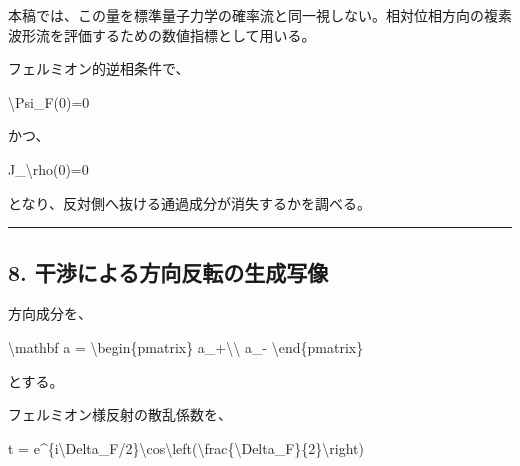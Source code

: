 \documentclass[
  a4paper,
]{article}
\newenvironment{Shaded}{}{}
\newcommand{\NormalTok}[1]{#1}
\begin{document}
本稿では、この量を標準量子力学の確率流と同一視しない。相対位相方向の複素波形流を評価するための数値指標として用いる。

フェルミオン的逆相条件で、

\begin{Shaded}
\begin{Highlighting}[]
\NormalTok{\textbackslash{}Psi\_F(0)=0}
\end{Highlighting}
\end{Shaded}

かつ、

\begin{Shaded}
\begin{Highlighting}[]
\NormalTok{J\_\textbackslash{}rho(0)=0}
\end{Highlighting}
\end{Shaded}

となり、反対側へ抜ける通過成分が消失するかを調べる。

\begin{center}\rule{0.5\linewidth}{0.5pt}\end{center}

\subsection{8.
干渉による方向反転の生成写像}\label{ux5e72ux6e09ux306bux3088ux308bux65b9ux5411ux53cdux8ee2ux306eux751fux6210ux5199ux50cf}

方向成分を、

\begin{Shaded}
\begin{Highlighting}[]
\NormalTok{\textbackslash{}mathbf a}
\NormalTok{=}
\NormalTok{\textbackslash{}begin\{pmatrix\}}
\NormalTok{a\_+\textbackslash{}\textbackslash{}}
\NormalTok{a\_{-}}
\NormalTok{\textbackslash{}end\{pmatrix\}}
\end{Highlighting}
\end{Shaded}

とする。

フェルミオン様反射の散乱係数を、

\begin{Shaded}
\begin{Highlighting}[]
\NormalTok{t}
\NormalTok{=}
\NormalTok{e\^{}\{i\textbackslash{}Delta\_F/2\}\textbackslash{}cos\textbackslash{}left(\textbackslash{}frac\{\textbackslash{}Delta\_F\}\{2\}\textbackslash{}right)}
\end{Highlighting}
\end{Shaded}
\end{document}
